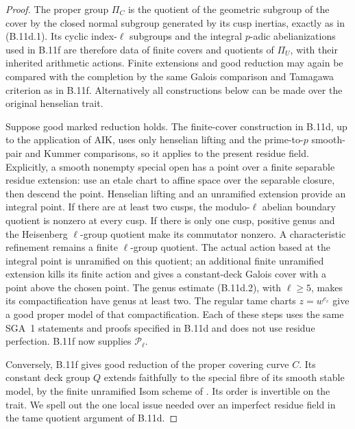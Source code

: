 \begin{proof}
The proper group $\Pi_C$ is the quotient of the geometric subgroup
of the cover by the closed normal subgroup generated by its cusp
inertias, exactly as in (B.11d.1). Its cyclic index-$\ell$ subgroups
and the integral $p$-adic abelianizations used in B.11f are therefore
data of finite covers and quotients of $\Pi_U$, with their inherited
arithmetic actions. Finite extensions and good reduction may again
be compared with the completion by the same Galois comparison and
Tamagawa criterion as in B.11f. Alternatively all constructions below
can be made over the original henselian trait.

Suppose good marked reduction holds. The finite-cover construction
in B.11d, up to the application of AIK, uses only henselian lifting
and the prime-to-$p$ smooth-pair and Kummer comparisons, so it applies
to the present residue field. Explicitly, a smooth nonempty special
open has a point over a finite separable residue extension: use an
etale chart to affine space over the separable closure, then descend
the point. Henselian lifting and an unramified extension provide an
integral point. If there are at least two cusps, the modulo-$\ell$
abelian boundary quotient is nonzero at every cusp. If there is only
one cusp, positive genus and the Heisenberg $\ell$-group quotient
make its commutator nonzero. A characteristic refinement remains a
finite $\ell$-group quotient. The actual action based at the integral
point is unramified on this quotient; an additional finite unramified
extension kills its finite action and gives a constant-deck Galois
cover with a point above the chosen point. The genus estimate
(B.11d.2), with $\ell\ge5$, makes its compactification have genus
at least two. The regular tame charts $z=w^{e_c}$ give a good
proper model of that compactification. Each of these steps uses the
same SGA~1 statements and proofs specified in B.11d and does not use
residue perfection. B.11f now supplies $\mathcal P_\ell$.

Conversely, B.11f gives good reduction of the proper covering curve
$C$. Its constant deck group $Q$ extends faithfully to the special
fibre of its smooth stable model, by the finite unramified Isom
scheme of \citet[Theorem 1.11]{BC_DM}. Its order is invertible on
the trait. We spell out the one local issue needed over an imperfect
residue field in the tame quotient argument of B.11d.


\end{proof}

